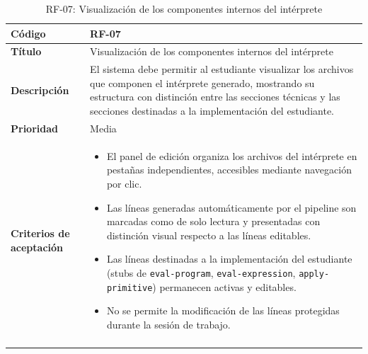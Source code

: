 \begin{longtable}{|>{\bfseries}p{3cm}|p{11cm}|}
\hline
\textbf{Código} & RF-07 \\
\hline
\textbf{Título} & Visualización de los componentes internos del intérprete \\
\hline
\textbf{Descripción} & El sistema debe permitir al estudiante visualizar los archivos que componen el intérprete generado, mostrando su estructura con distinción entre las secciones técnicas y las secciones destinadas a la implementación del estudiante. \\
\hline
\textbf{Prioridad} & Media \\
\hline
\textbf{Criterios de aceptación} &
\begin{itemize}[leftmargin=*,topsep=2pt,itemsep=1pt,parsep=0pt]
    \item El panel de edición organiza los archivos del intérprete en pestañas independientes, accesibles mediante navegación por clic.
    \item Las líneas generadas automáticamente por el pipeline son marcadas como de solo lectura y presentadas con distinción visual respecto a las líneas editables.
    \item Las líneas destinadas a la implementación del estudiante (stubs de \texttt{eval-program}, \texttt{eval-expression}, \texttt{apply-primitive}) permanecen activas y editables.
    \item No se permite la modificación de las líneas protegidas durante la sesión de trabajo.
\end{itemize} \\
\hline
\caption{RF-07: Visualización de los componentes internos del intérprete}
\label{tab:rf07}
\end{longtable}

